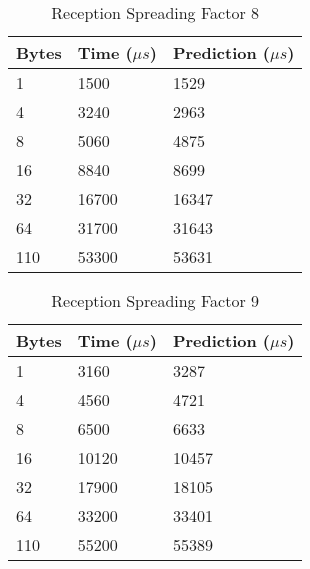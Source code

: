 \begin{table}[H]
\centering
\begin{tabular}{@{}lll@{}}
\toprule
\multicolumn{1}{|c|}{\cellcolor[HTML]{C0C0C0}Bytes} & Time ($\mu s$) & Prediction ($\mu s$) \\ \midrule
1                                                   & 1500      & 1529       \\
4                                                   & 3240      & 2963       \\
8                                                   & 5060      & 4875       \\
16                                                  & 8840      & 8699       \\
32                                                  & 16700     & 16347      \\
64                                                  & 31700     & 31643      \\
110                                                 & 53300     & 53631      \\ \bottomrule
\end{tabular}
\caption{Reception Spreading Factor 8\label{table:rxsf8}}
\end{table}

\begin{table}[H]
\centering
\begin{tabular}{@{}lll@{}}
\toprule
\multicolumn{1}{|c|}{\cellcolor[HTML]{C0C0C0}Bytes} & Time ($\mu s$) & Prediction ($\mu s$) \\ \midrule
1                                                   & 3160      & 3287       \\
4                                                   & 4560      & 4721       \\
8                                                   & 6500      & 6633       \\
16                                                  & 10120     & 10457      \\
32                                                  & 17900     & 18105      \\
64                                                  & 33200     & 33401      \\
110                                                 & 55200     & 55389      \\ \bottomrule
\end{tabular}
\caption{Reception Spreading Factor 9\label{table:rxsf9}}
\end{table}

